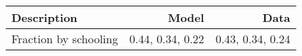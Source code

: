 \begin{tabular}{lrr}
\hline
Description & Model  & Data  \\ 
\hline
Fraction by schooling & 0.44, 0.34, 0.22  & 0.43, 0.34, 0.24  \\ 
\hline
\end{tabular}%
